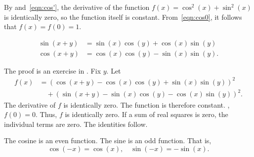 \begin{proved}
  By  and~\eqref{eqn:cos'}, the
  derivative of the function $f(x) = \cos^2(x) +\sin^2(x)$ is
  identically zero, so the function itself is constant.
  From~\eqref{eqn:cos0}, it follows that $f(x)=f(0)=1$.
  \swallowed\end{proved}



\begin{lemma}[]\label{lemma:sin-add}
\begin{align*}
\sin(x+y) &= \sin(x)\cos(y) + \cos(x)\sin(y)\\
\cos(x+y)  &= \cos(x)\cos(y) - \sin(x)\sin(y).
\end{align*}
\end{lemma}
%

\begin{proved}
The proof is an exercise in .
Fix $y$.  Let
\begin{align*}
f(x) &=(\cos(x+y) - \cos(x)\cos(y) +
\sin(x)\sin(y))^2 \\ 
  &\quad+ (\sin(x+y) -\sin(x)\cos(y) -\cos(x)\sin(y))^2.
\end{align*}
The derivative of $f$ is identically zero.  The function is therefore
constant.  , $f(0)=0$.  Thus, $f$ is
identically zero.  If a sum of real squares is zero, the individual
terms are zero. The identities follow.  \swallowed\end{proved}

\begin{lemma}[]\label{lemma:cos-neg}
  The cosine is an even function.  The sine is an odd function.  That
  is,
\[ 
\cos(-x) = \cos(x),\quad\sin(-x) =
    -\sin(x).
\] 
\end{lemma}
%
%
%


